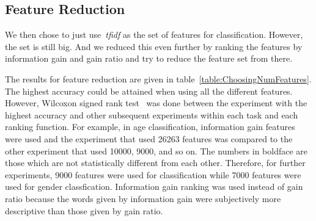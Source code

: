 \documentclass[a4paper]{llncs}
\begin{document}


\subsection{Feature Reduction}
We then chose to just use~\textit{tfidf} as the set of features for classification. However, the set is still big. And we reduced this even further by ranking the features by information gain and gain ratio and try to reduce the feature set from there.  

The results for feature reduction are given in table~\ref{table:ChoosingNumFeatures}. The highest accuracy could be attained when using all the different features. However, Wilcoxon signed rank test~\cite{wilcoxon1945individual} was done between the experiment with the highest accuracy and other subsequent experiments within each task and each ranking function. For example, in age classification, information gain features were used and the experiment that used 26263 features was compared to the other experiment that used 10000, 9000, and so on. The numbers in boldface are those which are not statistically different from each other. Therefore, for further experiments, 9000 features were used for classification while 7000 features were used for gender classfication. Information gain ranking was used instead of gain ratio because the words given by information gain were subjectively more descriptive than those given by gain ratio. 
\end{document}
